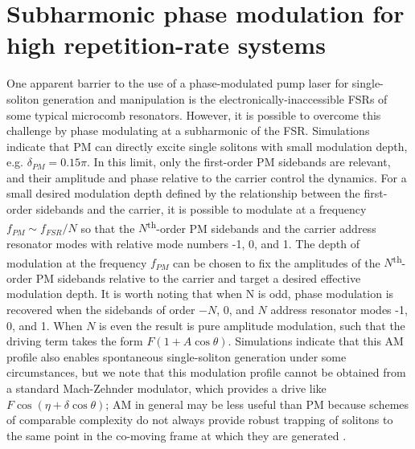 \section{Subharmonic phase modulation for high repetition-rate systems}

One apparent barrier to the use of a phase-modulated pump laser for single-soliton generation and manipulation is the electronically-inaccessible FSRs of some typical microcomb resonators. However, it is possible to overcome this challenge by phase modulating at a subharmonic of the FSR.  Simulations indicate that PM can directly excite single solitons with small modulation depth, e.g. $\delta_{PM}=0.15\pi$. In this limit, only the first-order PM sidebands are relevant, and their amplitude and phase relative to the carrier control the dynamics. For a small desired modulation depth defined by the relationship between the first-order sidebands and the carrier, it is possible to modulate at a frequency $f_{PM}\sim f_{FSR}/N$ so that the $N$\textsuperscript{th}-order PM sidebands and the carrier address resonator modes with relative mode numbers -1, 0, and 1. The depth of modulation at the frequency $f_{PM}$ can be chosen to fix the amplitudes of the $N$\textsuperscript{th}-order PM sidebands relative to the carrier and target a desired effective modulation depth. It is worth noting that when N is odd, phase modulation is recovered when the sidebands of order $-N$, 0, and $N$ address resonator modes -1, 0, and 1. When $N$ is even the result is pure amplitude modulation, such that the driving term takes the form $F(1+A \cos{\theta})$. Simulations indicate that this AM profile also enables spontaneous single-soliton generation under some circumstances, but we note that this modulation profile cannot be obtained from a standard Mach-Zehnder modulator, which provides a drive like $F \cos(\eta+\delta \cos{\theta})$; AM in general may be less useful than PM because schemes of comparable complexity do not always provide robust trapping of solitons to the same point in the co-moving frame at which they are generated \cite{Hendry2018}.

